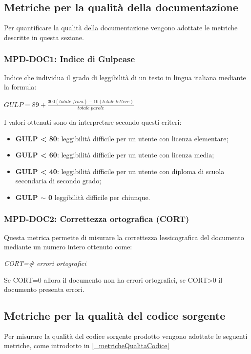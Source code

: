 \subsection{Metriche per la qualità della documentazione} \label{_metricheprodotto}
Per quantificare la qualità della documentazione vengono adottate le metriche descritte in questa sezione.
\subsubsection{MPD-DOC1: Indice di Gulpease}
Indice che individua il grado di leggibilità di un testo in lingua italiana mediante la formula:
\begin{center}
    \(GULP=89+\frac{300(totale\; frasi)-10(totale\; lettere)}{totale\; parole}\)
\end{center}
I valori ottenuti sono da interpretare secondo questi criteri:
\begin{itemize}
    \item \textbf{GULP < 80}: leggibilità difficile per un utente con licenza elementare;
    \item \textbf{GULP < 60}: leggibilità difficile per un utente con licenza media;
    \item \textbf{GULP < 40}: leggibilità difficile per un utente con diploma di scuola secondaria di secondo grado;
    \item \textbf{GULP \(\sim\) 0} leggibilità difficile per chiunque.
\end{itemize}

\subsubsection{MPD-DOC2: Correttezza ortografica (CORT)}
Questa metrica permette di misurare la correttezza lessicografica del documento mediante un numero intero ottenuto come:
\begin{center}
    \textit{CORT=\# errori ortografici}
\end{center}
Se CORT=0 allora il documento non ha errori ortografici, se CORT>0 il documento presenta errori.

\subsection{Metriche per la qualità del codice sorgente} \label{_metricheCodiceSorgenteApp}
Per misurare la qualità del codice sorgente prodotto vengono adottate le seguenti metriche, come introdotto in \ref{_metricheQualitaCodice}


